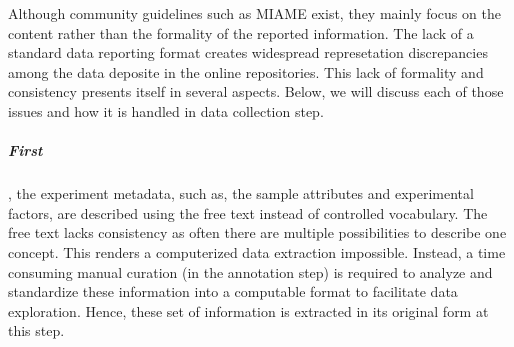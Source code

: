 Although community guidelines such as MIAME \cite{Brazma2001} exist, they
mainly focus on the content rather than the formality of the reported
information.
%
The lack of a standard data reporting format creates widespread represetation
discrepancies among the data deposite in the online repositories.
%
%
This lack of formality and consistency presents itself in several aspects.
%
Below, we will discuss each of those issues and how it is handled in data
collection step.


\subparagraph{First}, the experiment metadata, such as, the sample attributes and
experimental factors, are described using the free text instead of
controlled vocabulary.
%
The free text lacks consistency as often there are multiple possibilities
to describe one concept.
%
This renders a computerized data extraction impossible. Instead, a time
consuming manual curation (in the annotation step) is required to analyze
and standardize these information into a computable format to facilitate
data exploration.
%
Hence, these set of information is extracted in its original form at this
step.






